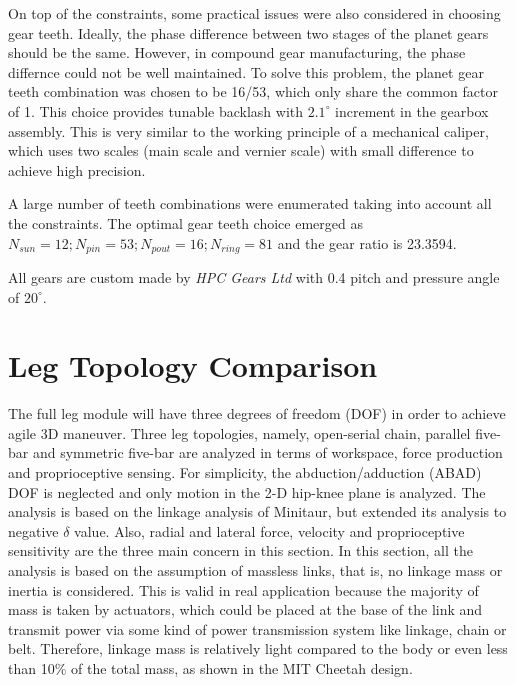 On top of the constraints, some practical issues were also considered in choosing gear teeth. Ideally, the phase difference between two stages of the planet gears should be the same. However, in compound gear manufacturing, the phase differnce could not be well maintained. To solve this problem, the planet gear teeth combination was chosen to be 16/53, which only share the common factor of 1. This choice provides tunable backlash with $2.1^{\circ}$ increment in the gearbox assembly. This is very similar to the working principle of a mechanical caliper, which uses two scales (main scale and vernier scale) with small difference to achieve high precision.

A large number of teeth combinations were enumerated taking into account all the constraints. The optimal gear teeth choice emerged as $N_{sun} = 12; N_{pin} = 53; N_{pout} = 16; N_{ring} = 81$ and the gear ratio is 23.3594.

All gears are custom made by \textit{HPC Gears Ltd} with 0.4 pitch and pressure angle of $20^{\circ}$.

\section{Leg Topology Comparison}
\label{sec:LegComparison}
The full leg module will have three degrees of freedom (DOF) in order to achieve agile 3D maneuver. Three leg topologies, namely, open-serial chain, parallel five-bar and symmetric five-bar are analyzed in terms of workspace, force production and proprioceptive sensing. For simplicity, the abduction/adduction (ABAD) DOF is neglected and only motion in the 2-D hip-knee plane is analyzed. The analysis is based on the linkage analysis of Minitaur\cite{Kenneally2016}, but extended its analysis to negative $\delta$ value. Also, radial and lateral force, velocity and proprioceptive sensitivity are the three main concern in this section. In this section, all the analysis is based on the assumption of massless links, that is, no linkage mass or inertia is considered. This is valid in real application because the majority of mass is taken by actuators, which could be placed at the base of the link and transmit power via some kind of power transmission system like linkage, chain or belt. Therefore, linkage mass is relatively light compared to the body or even less than 10\% of the total mass, as shown in the MIT Cheetah design\cite{Hae-WonPark1PatrickM.Wensing22015}.

